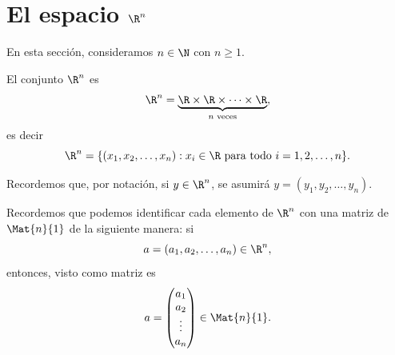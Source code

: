 \documentclass[a4,11pt]{aleph-notas}
\begin{document}
\encabezado

\section{El espacio $\R^n$}

En esta sección, consideramos $n\in\N$ con $n\geq 1$.

\begin{defi}[El conjunto $\R^n$]
    El conjunto $\R^n$ es
    \[
        \R^n=\underbrace{\R\times\R\times\cdots\times\R}_{n\text{ veces}},
    \]
    es decir
    \[
        \R^n=\{(x_1,x_2,\ldots,x_n):x_i\in\R\text{ para todo }i=1,2,\ldots,n\}.
    \]
\end{defi}

\begin{advertencia}
    Recordemos que, por notación, si $y\in\R^n$, se asumirá $y=(y_1,y_2,\ldots,y_n)$.
\end{advertencia}

\begin{advertencia}
    Recordemos que podemos identificar cada elemento de $\R^n$ con una matriz de $\Mat{n}{1}$ de la siguiente manera: si
    \[
        a = (a_1,a_2,\ldots,a_n) \in \R^n,
    \]
    entonces, visto como matriz es
    \[
        a = 
        \begin{pmatrix}
            a_1\\a_2\\
            \vdots\\a_n
        \end{pmatrix}
        \in \Mat{n}{1}.
    \]
\end{advertencia}
\end{document}
